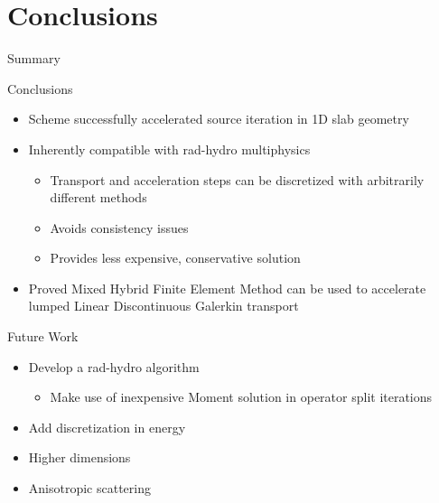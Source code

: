 \documentclass[10pt]{beamer}
\begin{document}





\section{Conclusions}

\begin{frame}{Summary}

    \onslide<+->
    Conclusions
    \begin{itemize} \vspace{-.1in}
        \item Scheme successfully accelerated source iteration in 1D slab geometry 

        \item Inherently compatible with rad-hydro multiphysics 

        \begin{itemize}
            \item Transport and acceleration steps can be discretized with arbitrarily different methods 
            \item Avoids consistency issues 
            \item Provides less expensive, conservative solution 
        \end{itemize}

        \item Proved Mixed Hybrid Finite Element Method can be used to accelerate lumped Linear Discontinuous Galerkin transport 

    \end{itemize}

    \onslide<+->
    Future Work 
    \begin{itemize} \vspace{-.1in}
        \item Develop a rad-hydro algorithm 

        \begin{itemize}
            \item Make use of inexpensive Moment solution in operator split iterations 
        \end{itemize}

        \item Add discretization in energy 

        \item Higher dimensions 

        \item Anisotropic scattering 

    \end{itemize}

\end{frame}
\end{document}
